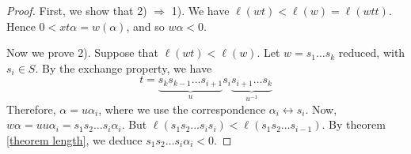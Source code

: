 \documentclass[envcountsame,envcountchap]{svmono}
\begin{document}
\begin{proof}
First, we show that 2) $\Rightarrow$ 1). We have $\ell (w t) < \ell (w) = \ell (w t t)$. Hence $0<x t \alpha = w (\alpha)$, and so $w \alpha < 0$. 

Now we prove 2). Suppose that $\ell (wt) < \ell (w)$. Let $w = s_1 \ldots s_k$ reduced, with $s_i \in S$. By the exchange property, we have
\begin{equation}
t = \underbrace{s_k s_{k-1} \ldots s_{i+1}}_{u} s_i \underbrace{s_{i+1} \ldots s_k}_{u^{-1}}
\end{equation} Therefore, $\alpha = u \alpha_i$, where we use the correspondence $\alpha_i \leftrightarrow s_i$. Now, $w \alpha = u u \alpha_i = s_1 s_2 \ldots s_i \alpha_i$. But $\ell (s_1 s_2 \ldots s_i s_i) < \ell (s_1 s_2 \ldots s_{i-1} )$. By theorem \ref{theorem length}, we deduce $s_1 s_2 \ldots s_i \alpha_i < 0$.   
\end{proof}
	
	
\end{document}
